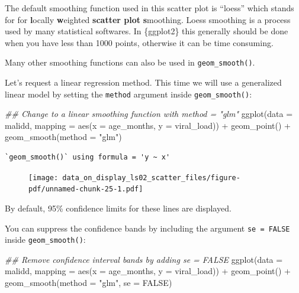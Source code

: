 \documentclass[
  letterpaper,
  DIV=11,
  numbers=noendperiod]{scrreprt}
\newenvironment{Shaded}{\begin{snugshade}}{\end{snugshade}}
\newcommand{\AttributeTok}[1]{\textcolor[rgb]{0.40,0.45,0.13}{#1}}
\newcommand{\ConstantTok}[1]{\textcolor[rgb]{0.56,0.35,0.01}{#1}}
\newcommand{\DocumentationTok}[1]{\textcolor[rgb]{0.37,0.37,0.37}{\textit{#1}}}
\newcommand{\FunctionTok}[1]{\textcolor[rgb]{0.28,0.35,0.67}{#1}}
\newcommand{\NormalTok}[1]{\textcolor[rgb]{0.00,0.23,0.31}{#1}}
\newcommand{\SpecialCharTok}[1]{\textcolor[rgb]{0.37,0.37,0.37}{#1}}
\newcommand{\StringTok}[1]{\textcolor[rgb]{0.13,0.47,0.30}{#1}}
\begin{document}
The default smoothing function used in this scatter plot is ``loess''
which stands for for \textbf{l}ocally \textbf{w}eighted \textbf{scatter
plot} \textbf{s}moothing. Loess smoothing is a process used by many
statistical softwares. In \{ggplot2\} this generally should be done when
you have less than 1000 points, otherwise it can be time consuming.

Many other smoothing functions can also be used in
\texttt{geom\_smooth()}.

Let's request a linear regression method. This time we will use a
generalized linear model by setting the \texttt{method} argument inside
\texttt{geom\_smooth()}:

\begin{Shaded}
\begin{Highlighting}[]
\DocumentationTok{\#\# Change to a linear smoothing function with \textasciigrave{}method = "glm"\textasciigrave{}}
\FunctionTok{ggplot}\NormalTok{(}\AttributeTok{data =}\NormalTok{ malidd, }
       \AttributeTok{mapping =} \FunctionTok{aes}\NormalTok{(}\AttributeTok{x =}\NormalTok{ age\_months, }
                     \AttributeTok{y =}\NormalTok{ viral\_load)) }\SpecialCharTok{+} 
  \FunctionTok{geom\_point}\NormalTok{() }\SpecialCharTok{+}
  \FunctionTok{geom\_smooth}\NormalTok{(}\AttributeTok{method =} \StringTok{"glm"}\NormalTok{)}
\end{Highlighting}
\end{Shaded}

\begin{verbatim}
`geom_smooth()` using formula = 'y ~ x'
\end{verbatim}

\begin{figure}[H]

{\centering \texttt{[image: data\_on\_display\_ls02\_scatter\_files/figure-pdf/unnamed-chunk-25-1.pdf]}

}

\end{figure}

By default, 95\% confidence limits for these lines are displayed.

You can suppress the confidence bands by including the argument
\texttt{se\ =\ FALSE} inside \texttt{geom\_smooth()}:

\begin{Shaded}
\begin{Highlighting}[]
\DocumentationTok{\#\# Remove confidence interval bands by adding \textasciigrave{}se = FALSE\textasciigrave{}}
\FunctionTok{ggplot}\NormalTok{(}\AttributeTok{data =}\NormalTok{ malidd, }
       \AttributeTok{mapping =} \FunctionTok{aes}\NormalTok{(}\AttributeTok{x =}\NormalTok{ age\_months, }
                     \AttributeTok{y =}\NormalTok{ viral\_load)) }\SpecialCharTok{+} 
  \FunctionTok{geom\_point}\NormalTok{() }\SpecialCharTok{+}
  \FunctionTok{geom\_smooth}\NormalTok{(}\AttributeTok{method =} \StringTok{"glm"}\NormalTok{,}
              \AttributeTok{se =} \ConstantTok{FALSE}\NormalTok{)}
\end{Highlighting}
\end{Shaded}
\end{document}
